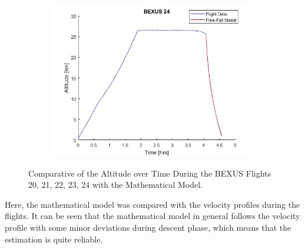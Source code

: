 \begin{figure}[H]
\begin{subfigure}{0.45\textwidth}
    \centering\includegraphics[width=1.1\textwidth]{appendix/img/bexus24mathmodel.png}
  \end{subfigure}
  \caption{Comparative of the Altitude over Time During the BEXUS Flights 20, 21, 22, 23, 24 with the Mathematical Model.}\label{fig:bexustrajectories}
  \end{figure}
  
 
 

Here, the mathematical model was compared with the velocity profiles during the flights. It can be seen that the mathematical model in general follows the velocity profile with some minor deviations during descent phase, which means that the estimation is quite reliable.

